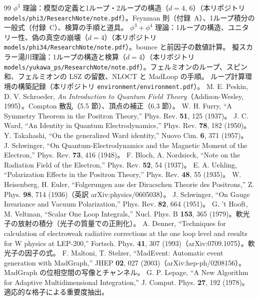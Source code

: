 \documentclass[a4paper,10pt]{ltjsarticle}
\begin{document}
\begin{thebibliography}{99}
\small
{} $\phi^3$ 理論：模型の定義と1ループ・2ループの構造（$d=4,\,6$）（本リポジトリ \nolinkurl{models/phi3/ResearchNote/note.pdf}）。Feynman 則（付録~A）、1ループ積分の一般式（付録~C）、検算の手順と道具。
 $\phi^3+\phi^4$ 理論：1ループの構造、ユニタリー性、偽の真空の崩壊（$d=4$）（本リポジトリ \nolinkurl{models/phi34/ResearchNote/note.pdf}）。bounce と前因子の数値計算。
 擬スカラー湯川理論：1ループの構造と検算（$d=4$）（本リポジトリ \nolinkurl{models/yukawa_ps/ResearchNote/note.pdf}）。フェルミオンのループ、スピン和、フェルミオンの LSZ の留数、NLOCT と MadLoop の手順。
 ループ計算環境の構築記録（本リポジトリ \nolinkurl{environment/environment.pdf}）。
 M. E. Peskin, D. V. Schroeder, \textit{An Introduction to Quantum Field Theory}（Addison-Wesley, 1995）。Compton 散乱（5.5 節）、頂点の補正（6.3 節）。
 W. H. Furry, ``A Symmetry Theorem in the Positron Theory,'' Phys. Rev. \textbf{51}, 125 (1937)。
 J. C. Ward, ``An Identity in Quantum Electrodynamics,'' Phys. Rev. \textbf{78}, 182 (1950)。
 Y. Takahashi, ``On the generalized Ward identity,'' Nuovo Cim. \textbf{6}, 371 (1957)。
 J. Schwinger, ``On Quantum-Electrodynamics and the Magnetic Moment of the Electron,'' Phys. Rev. \textbf{73}, 416 (1948)。
 F. Bloch, A. Nordsieck, ``Note on the Radiation Field of the Electron,'' Phys. Rev. \textbf{52}, 54 (1937)。
 E. A. Uehling, ``Polarization Effects in the Positron Theory,'' Phys. Rev. \textbf{48}, 55 (1935)。
 W. Heisenberg, H. Euler, ``Folgerungen aus der Diracschen Theorie des Positrons,'' Z. Phys. \textbf{98}, 714 (1936)（英訳 arXiv:physics/0605038）。
 J. Schwinger, ``On Gauge Invariance and Vacuum Polarization,'' Phys. Rev. \textbf{82}, 664 (1951)。
 G. 't Hooft, M. Veltman, ``Scalar One Loop Integrals,'' Nucl. Phys. B \textbf{153}, 365 (1979)。軟光子の放射の積分（光子の質量での正則化）。
 A. Denner, ``Techniques for calculation of electroweak radiative corrections at the one loop level and results for W physics at LEP-200,'' Fortsch. Phys. \textbf{41}, 307 (1993)（arXiv:0709.1075）。軟光子の因子の式。
 F. Maltoni, T. Stelzer, ``MadEvent: Automatic event generation with MadGraph,'' JHEP \textbf{02}, 027 (2003)（arXiv:hep-ph/0208156）。MadGraph の位相空間の写像とチャンネル。
 G. P. Lepage, ``A New Algorithm for Adaptive Multidimensional Integration,'' J. Comput. Phys. \textbf{27}, 192 (1978)。適応的な格子による重要度抽出。

\end{thebibliography}
\end{document}
